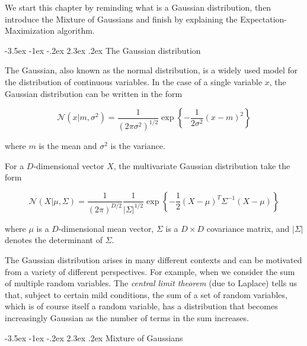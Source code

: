 \documentclass[]{book}
\makeatletter
\renewcommand\section{\@startsection {section}{1}{\z@}%
                                   {-3.5ex \@plus -1ex \@minus -.2ex}%
                                   {2.3ex \@plus.2ex}%
                                   {\normalfont\Large\bfseries\color{ForestGreen}}}
\theoremstyle{definition}
\theoremstyle{definition}
\theoremstyle{definition}
\theoremstyle{remark}
\makeatother
\begin{document}
We start this chapter by reminding what is a Gaussian distribution, then
introduce the Mixture of Gaussians and finish by explaining the
Expectation-Maximization algorithm.

\section{The Gaussian distribution}\label{the-gaussian-distribution}

The Gaussian, also known as the normal distribution, is a widely used
model for the distribution of continuous variables. In the case of a
single variable \(x\), the Gaussian distribution can be written in the
form

\begin{equation}
\mathcal{N}(x|m,\sigma^2)=\frac{1}{(2 \pi \sigma^2 )^{1/2}} \exp \left\lbrace - \frac{1}{2 \sigma^2} (x-m)^2\right\rbrace
\label{eq:normaldist1}
\end{equation}

where \(m\) is the mean and \(\sigma^2\) is the variance.

For a \(D\)-dimensional vector \(X\), the multivariate Gaussian
distribution take the form

\begin{equation}
\mathcal{N}(X|\mu,\Sigma)=\frac{1}{(2 \pi)^{D/2}} \frac{1}{|\Sigma|^{1/2}} \exp \left\lbrace - \frac{1}{2} (X-\mu)^T \Sigma^{-1} (X-\mu) \right\rbrace
\label{eq:normaldist2}
\end{equation}

where \(\mu\) is a \(D\)-dimensional mean vector, \(\Sigma\) is a
\(D\times D\) covariance matrix, and \(|\Sigma|\) denotes the
determinant of \(\Sigma\).

The Gaussian distribution arises in many different contexts and can be
motivated from a variety of different perspectives. For example, when we
consider the sum of multiple random variables. The \emph{central limit
theorem} (due to Laplace) tells us that, subject to certain mild
conditions, the sum of a set of random variables, which is of course
itself a random variable, has a distribution that becomes increasingly
Gaussian as the number of terms in the sum increases.

\section{Mixture of Gaussians}\label{mixture-of-gaussians}
\end{document}
